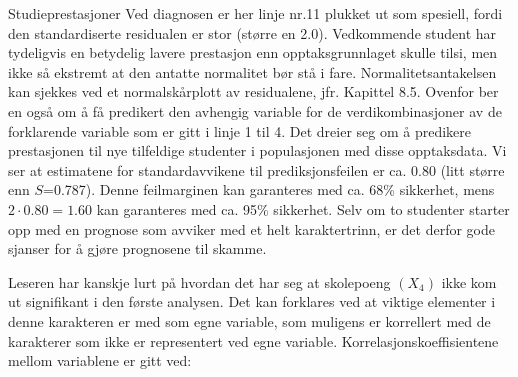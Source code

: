 \begin{eksempel}{Studieprestasjoner}
Ved diagnosen er her linje nr.11 plukket ut som spesiell, fordi den 
standardiserte residualen er stor (større en 2.0).  Vedkommende
student har tydeligvis en betydelig lavere prestasjon enn opptaksgrunnlaget
skulle tilsi, men ikke så ekstremt at den antatte normalitet bør
stå i fare. Normali\-tets\-antakelsen kan sjekkes ved et normalskårplott
av residualene, jfr. Kapittel 8.5.  Ovenfor ber en også om å få
predikert den avhengig variable for de verdikombinasjoner av de forklarende
variable som er gitt i linje 1 til 4.  Det dreier seg om å predikere prestasjonen til nye tilfeldige studenter i populasjonen med disse
opptaksdata.  Vi ser at estimatene for standardavvikene til prediksjonsfeilen
er ca. 0.80 (litt større enn $S$=0.787).  Denne feilmarginen kan garanteres
med ca. 68\% sikkerhet, mens $2\cdot 0.80 = 1.60$ kan garanteres med ca. 95\%
sikkerhet.  Selv om to studenter starter opp med en prognose som avviker
med et helt karaktertrinn, er det derfor gode sjanser for å gjøre
prognosene til skamme.  

Leseren har kanskje lurt på hvordan det har seg at skolepoeng $(X_4)$ ikke
kom ut signifikant i den første analysen.  Det kan forklares ved at viktige
elementer i denne karakteren er med som egne variable, som muligens er
korrellert med de karakterer som ikke er representert ved egne variable.
Korrelasjonskoeffisientene mellom variablene er gitt ved:

\begin{center}  \end{center}


\end{eksempel}
